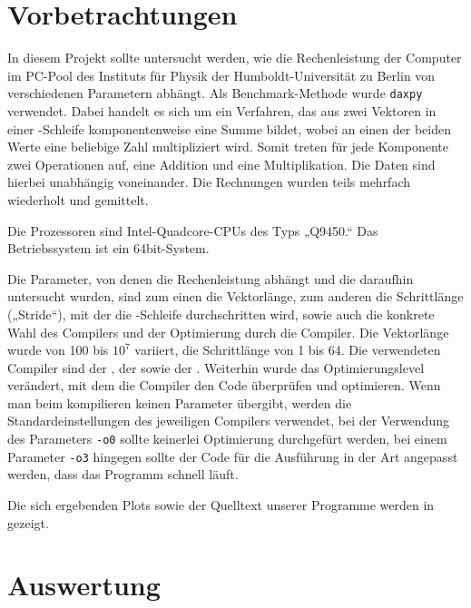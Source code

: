 \section{Vorbetrachtungen}
In diesem Projekt sollte untersucht werden, wie die Rechenleistung der Computer
im PC-Pool des Instituts für Physik der Humboldt-Universität zu Berlin von
verschiedenen Parametern abhängt. Als Benchmark-Methode wurde \texttt{daxpy}
verwendet. Dabei handelt es sich um ein Verfahren, das aus zwei Vektoren in einer \for-Schleife
komponentenweise eine Summe bildet, wobei an einen der beiden Werte eine
beliebige Zahl multipliziert wird. Somit treten für jede Komponente zwei
Operationen auf, eine Addition und eine Multiplikation. Die Daten sind hierbei 
unabhängig voneinander. Die Rechnungen wurden teils mehrfach wiederholt und
gemittelt.

Die Prozessoren sind Intel-Quadcore-CPUs des Typs „Q9450.“ Das Betriebssystem ist
ein 64bit-System.

Die Parameter, von denen die Rechenleistung abhängt und die daraufhin untersucht
wurden, sind zum einen die Vektorlänge, zum anderen die Schrittlänge („Stride“),
mit der die \for-Schleife durchschritten wird,
sowie auch die konkrete Wahl des Compilers und der Optimierung durch die 
Compiler. Die Vektorlänge wurde von 100 bis $10^7$ variiert, die Schrittlänge 
von 1 bis 64. Die verwendeten Compiler sind der \gcc, der \icc sowie der \pgcc.
Weiterhin wurde das Optimierungslevel verändert, mit dem die Compiler den Code 
überprüfen und optimieren. Wenn man beim kompilieren keinen Parameter übergibt, 
werden die Standardeinstellungen des jeweiligen Compilers verwendet, bei der
Verwendung des Parameters \texttt{-o0} sollte keinerlei Optimierung durchgefürt
werden, bei einem Parameter \texttt{-o3} hingegen sollte der Code für die
Ausführung in der Art angepasst werden, dass das Programm schnell läuft.

Die sich ergebenden Plots sowie der Quelltext unserer Programme werden in 
gezeigt.



\section{Auswertung}
